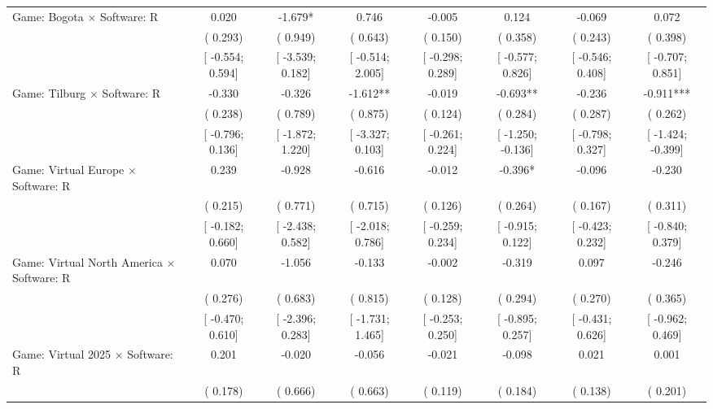\begin{tabular}{l*{7}{c}}
Game: Bogota $\times$ Software: R &    0.020   &   -1.679*   &    0.746   &   -0.005   &    0.124   &   -0.069   &    0.072   \\
                    &(    0.293)   &(    0.949)   &(    0.643)   &(    0.150)   &(    0.358)   &(    0.243)   &(    0.398)   \\
                    &[   -0.554;     0.594]   &[   -3.539;     0.182]   &[   -0.514;     2.005]   &[   -0.298;     0.289]   &[   -0.577;     0.826]   &[   -0.546;     0.408]   &[   -0.707;     0.851]   \\
Game: Tilburg $\times$ Software: R &   -0.330   &   -0.326   &   -1.612**   &   -0.019   &   -0.693**   &   -0.236   &   -0.911***   \\
                    &(    0.238)   &(    0.789)   &(    0.875)   &(    0.124)   &(    0.284)   &(    0.287)   &(    0.262)   \\
                    &[   -0.796;     0.136]   &[   -1.872;     1.220]   &[   -3.327;     0.103]   &[   -0.261;     0.224]   &[   -1.250;    -0.136]   &[   -0.798;     0.327]   &[   -1.424;    -0.399]   \\
Game: Virtual Europe $\times$ Software: R &    0.239   &   -0.928   &   -0.616   &   -0.012   &   -0.396*   &   -0.096   &   -0.230   \\
                    &(    0.215)   &(    0.771)   &(    0.715)   &(    0.126)   &(    0.264)   &(    0.167)   &(    0.311)   \\
                    &[   -0.182;     0.660]   &[   -2.438;     0.582]   &[   -2.018;     0.786]   &[   -0.259;     0.234]   &[   -0.915;     0.122]   &[   -0.423;     0.232]   &[   -0.840;     0.379]   \\
Game: Virtual North America $\times$ Software: R &    0.070   &   -1.056   &   -0.133   &   -0.002   &   -0.319   &    0.097   &   -0.246   \\
                    &(    0.276)   &(    0.683)   &(    0.815)   &(    0.128)   &(    0.294)   &(    0.270)   &(    0.365)   \\
                    &[   -0.470;     0.610]   &[   -2.396;     0.283]   &[   -1.731;     1.465]   &[   -0.253;     0.250]   &[   -0.895;     0.257]   &[   -0.431;     0.626]   &[   -0.962;     0.469]   \\
Game: Virtual 2025 $\times$ Software: R &    0.201   &   -0.020   &   -0.056   &   -0.021   &   -0.098   &    0.021   &    0.001   \\
                    &(    0.178)   &(    0.666)   &(    0.663)   &(    0.119)   &(    0.184)   &(    0.138)   &(    0.201)   \\

\end{tabular}
